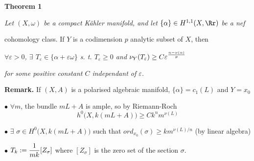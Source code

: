 \begin{slide}

\par\vspace{\bigskipamount}\noindent
{\bf Theorem 1} {\sl Let $(X, \omega)$ be a compact K\"ahler manifold, and let 
$\{\alpha \}\in H^{1,1}(X, {\Rr})$ be a nef 

\hskip 1.9cm cohomology class.
If $Y$ is a codimension $p$ analytic subset of $X$, then}
\par\vspace{\bigskipamount}\noindent
\centerline{\sl $\forall \varepsilon > 0$, $\exists$
$T_\varepsilon\in \{\alpha+ \varepsilon\omega\}$ \hskip 0.2cm s. t.  \hskip 0.2cm
$T_\varepsilon\geq 0$ \hskip 0.2cm and \hskip 0.2cm 
$\nu_Y(T_\varepsilon)\geq C \varepsilon^{{{n- \nu(\alpha)}\over {p}}}$}
\par\vspace{\bigskipamount}\noindent
\hskip 1.9cm {\sl for some positive constant $C$ independant of $\varepsilon$.}

\par\vspace{\bigskipamount}\noindent
{\bf Remark.} If $(X, A)$ is a polarised algebraic manifold, 
\hskip 0.2cm $\{\alpha\}= c_1(L)$ \hskip 0.2cm and \hskip 0.2cm $Y= x_0$

$\bullet$ $\forall m$, the bundle $mL+ A$ is ample, so by Riemann-Roch 
$$h^0\big(X, k(mL+ A)\big)\geq
Ck^nm^{\nu(L)}$$


$\bullet$ $\exists$
$\sigma\in H^0\big(X, k(mL+ A)\big)$ \hskip 0.2cm such that \hskip 0.2cm 
$ord_{x_0}(\sigma)\geq km^{\nu(L)/n}$\hskip 0.2cm
(by linear algebra)


$\bullet$ $\displaystyle T_k:= {{1}\over {mk}}[Z_\sigma]$  \hskip 0.2cm 
where $[Z_\sigma]$ is the zero set of 
the section $\sigma$.

\end{slide}


